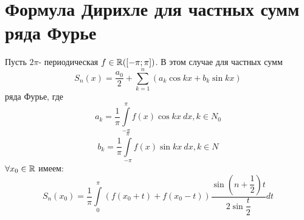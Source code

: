 \documentclass[../../main.tex]{subfiles}
\begin{document}
\section{Формула Дирихле для частных сумм ряда Фурье}
\begin{thm}
	Пусть $2\pi$- периодическая $f \in \mathbb{R}([-\pi;\pi])$. В этом случае для частных
	сумм
	\begin{equation}
		\label{18:1}
		S_n(x) = \dfrac{a_0}{2} + \sum_{k=1}^{n}(a_k\cos{kx} + b_k\sin{kx})
	\end{equation} 
	ряда Фурье, где
	\begin{equation}
		\label{18:2}
		a_k = \dfrac{1}{\pi}\int\limits_{-\pi}^{\pi}{f(x)\cos{kx}\ dx}, k \in N_0
	\end{equation}
	\begin{equation}
		\label{18:3}
		b_k = \dfrac{1}{\pi}\int\limits_{-\pi}^{\pi}{f(x)\sin{kx}\ dx}, k \in N
	\end{equation}
	$\forall x_0 \in \mathbb{R}$ имеем:
	\begin{equation}
		\label{18:4}
		S_n(x_0)=\dfrac{1}{\pi}\int\limits_{0}^{\pi}({f(x_0 + t) + f(x_0 - t)})
		\dfrac{\sin(n + \dfrac{1}{2})t}{2\sin{\dfrac{t}{2}}}dt
	\end{equation}
\end{thm}
\end{document}
